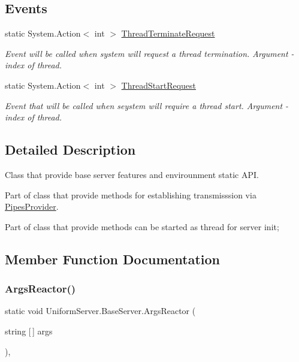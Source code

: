 \subsection*{Events}
\begin{DoxyCompactItemize}
\item 
static System.\+Action$<$ int $>$ \mbox{\hyperlink{class_uniform_server_1_1_base_server_a889c3aaa1cca7f4a9a4e32617516f4be}{Thread\+Terminate\+Request}}
\begin{DoxyCompactList}\small\item\em Event will be called when system will request a thread termination. Argument -\/ index of thread. \end{DoxyCompactList}\item 
static System.\+Action$<$ int $>$ \mbox{\hyperlink{class_uniform_server_1_1_base_server_a440a854a955ab7c5e563918c12e9b32c}{Thread\+Start\+Request}}
\begin{DoxyCompactList}\small\item\em Event that will be called when seystem will require a thread start. Argument -\/ index of thread. \end{DoxyCompactList}\end{DoxyCompactItemize}


\subsection{Detailed Description}
Class that provide base server features and envirounment static A\+PI. 

Part of class that provide methods for establishing transmisssion via \mbox{\hyperlink{namespace_pipes_provider}{Pipes\+Provider}}. 

Part of class that provide methods can be started as thread for server init; 

\subsection{Member Function Documentation}
\mbox{\label{class_uniform_server_1_1_base_server_a992660752da60019c348e18226a87bf2}} 
\subsubsection{\texorpdfstring{Args\+Reactor()}{ArgsReactor()}}
{\footnotesize\ttfamily static void Uniform\+Server.\+Base\+Server.\+Args\+Reactor (\begin{DoxyParamCaption}\item[{string \mbox{[}$\,$\mbox{]}}]{args }\end{DoxyParamCaption})\hspace{0.3cm}{\ttfamily [static]}, {\ttfamily [protected]}}



